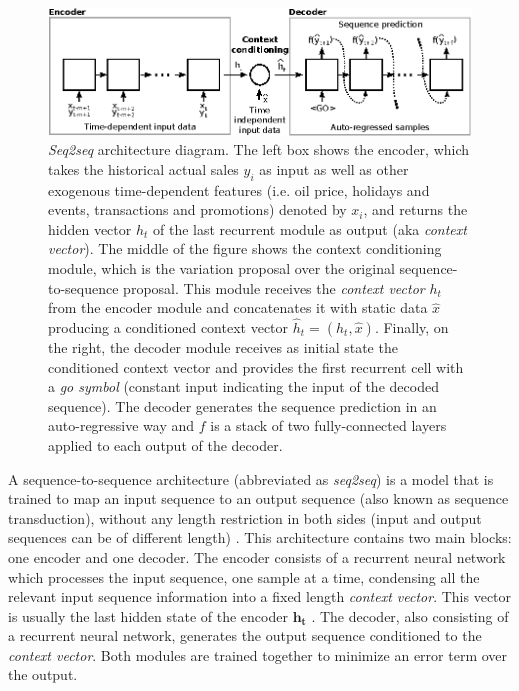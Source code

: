 \begin{figure}
	\centering
	\includegraphics[width=1\linewidth]{salesforecast/images/s2s}
	\caption[Diagram of the \textit{seq2seq} architecture]{\textit{Seq2seq} architecture diagram. The left box shows the encoder, which takes the historical actual sales $y_i$ as input as well as other exogenous time-dependent features (i.e. oil price, holidays and events, transactions and promotions) denoted by $x_i$, and returns the hidden vector $h_t$ of the last recurrent module as output (aka \textit{context vector}). The middle of the figure shows the context conditioning module, which is the variation proposal over the original sequence-to-sequence proposal. This module receives the \textit{context vector} $h_t$ from the encoder module and concatenates it with static data $\hat{x}$ producing a conditioned context vector $\hat{h}_t = (h_t, \hat{x})$. Finally, on the right, the decoder module receives as initial state the conditioned context vector and provides the first recurrent cell with a \textit{go symbol} (constant input indicating the input of the decoded sequence). The decoder generates the sequence prediction in an auto-regressive way and $f$ is a stack of two fully-connected layers applied to each output of the decoder.}
	\label{fig:s2s}
\end{figure}

A sequence-to-sequence architecture (abbreviated as \textit{seq2seq}) is a model that is trained to map an input sequence to an output sequence (also known as sequence transduction), without any length restriction in both sides (input and output sequences can be of different length) \autocite{sutskever2014}. This architecture contains two main blocks: one encoder and one decoder. The encoder consists of a recurrent neural network which processes the input sequence, one sample at a time, condensing all the relevant input sequence information into a fixed length \textit{context vector}. This vector is usually the last hidden state of the encoder $\mathbf{h_t}$ \autocite{uday2019}. The decoder, also consisting of a recurrent neural network, generates the output sequence conditioned to the \textit{context vector}. Both modules are trained together to minimize an error term over the output.



